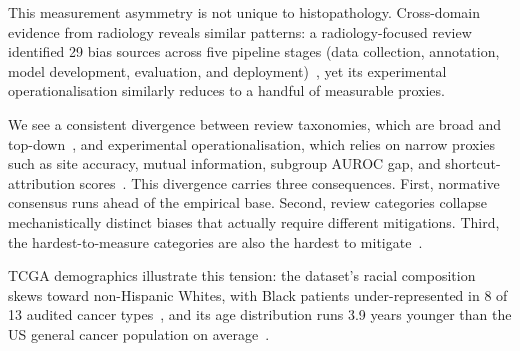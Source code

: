 This measurement asymmetry is not unique to histopathology. Cross-domain evidence from radiology reveals similar patterns: a radiology-focused review identified 29 bias sources across five pipeline stages (data collection, annotation, model development, evaluation, and deployment)~\citep{drukker2023toward}, yet its experimental operationalisation similarly reduces to a handful of measurable proxies.

We see a consistent divergence between review taxonomies, which are broad and top-down~\citep{yang2024survey, chen2023algorithmic, norori2021addressing, drukker2023toward}, and experimental operationalisation, which relies on narrow proxies such as site accuracy, mutual information, subgroup AUROC gap, and shortcut-attribution scores~\citep{ly2024shortcut, dawood2026confounding, banerjee2023shortcuts}. This divergence carries three consequences. First, normative consensus runs ahead of the empirical base. Second, review categories collapse mechanistically distinct biases that actually require different mitigations. Third, the hardest-to-measure categories are also the hardest to mitigate~\citep{zong2023medfair, cecconi2024fairness}.

TCGA demographics illustrate this tension: the dataset's racial composition skews toward non-Hispanic Whites, with Black patients under-represented in 8 of 13 audited cancer types~\citep{wang2018tcga}, and its age distribution runs 3.9 years younger than the US general cancer population on average~\citep{wang2018tcga}.

